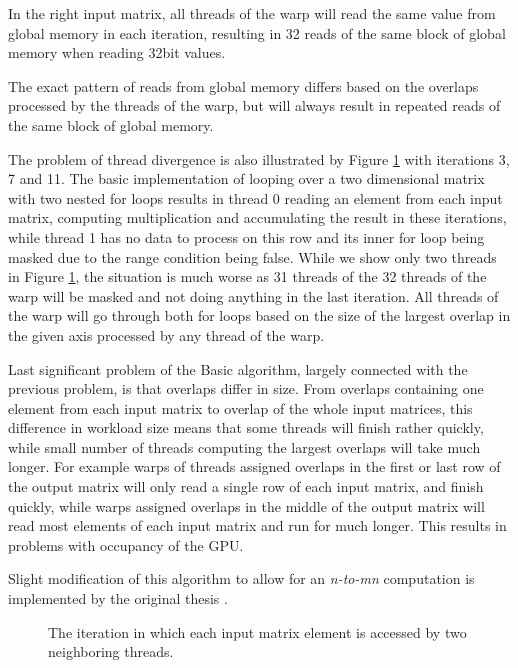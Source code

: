 In the right input matrix, all threads of the warp will read the same value from global memory in each iteration, resulting in 32 reads of the same block of global memory when reading 32bit values. 

The exact pattern of reads from global memory differs based on the overlaps processed by the threads of the warp, but will always result in repeated reads of the same block of global memory.


The problem of thread divergence is also illustrated by Figure \ref{fig:warp_shuffle_shuffle} with iterations 3, 7 and 11.
The basic implementation of looping over a two dimensional matrix with two nested for loops results in thread 0 reading an element from each input matrix, computing multiplication and accumulating the result in these iterations, while thread 1 has no data to process on this row and its inner for loop being masked due to the range condition being false. While we show only two threads in Figure \ref{fig:warp_shuffle_shuffle}, the situation is much worse as 31 threads of the 32 threads of the warp will be masked and not doing anything in the last iteration. All threads of the warp will go through both for loops based on the size of the largest overlap in the given axis processed by any thread of the warp. 

Last significant problem of the Basic algorithm, largely connected with the previous problem, is that overlaps differ in size. From overlaps containing one element from each input matrix to overlap of the whole input matrices, this difference in workload size means that some threads will finish rather quickly, while small number of threads computing the largest overlaps will take much longer. For example warps of threads assigned overlaps in the first or last row of the output matrix will only read a single row of each input matrix, and finish quickly, while warps assigned overlaps in the middle of the output matrix will read most elements of each input matrix and run for much longer. This results in problems with occupancy of the GPU.
  
  
Slight modification of this algorithm to allow for an \textit{n-to-mn} computation is implemented by the original thesis \citet{misko}.



\begin{figure}[ht]
	\centering
	\def\svgwidth{0.5\textwidth}
	\fontsize{8}{10}\selectfont
	
	\caption{The iteration in which each input matrix element is accessed by two neighboring threads.}
	\label{fig:warp_shuffle_shuffle}
\end{figure}



